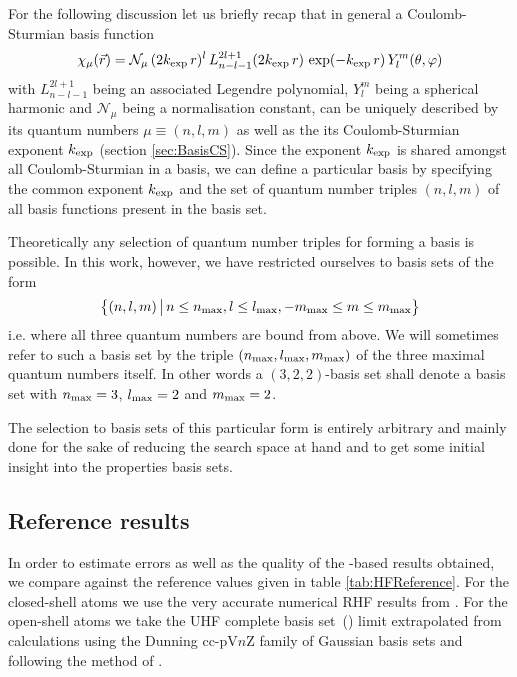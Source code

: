For the following discussion let us briefly recap
that in general a Coulomb-Sturmian basis function
\begin{equation}
\chi_\mu(\vec{r}) = \mathcal{N}_\mu \,
	(2 k_\text{exp} \, r)^l \,
	L^{2l+1}_{n-l-1}(2 k_\text{exp} \, r) \,
	\exp(- k_\text{exp} \, r) \,
	Y_l^m(\theta, \varphi)
	\label{eqn:FormCSBasisFunction}
\end{equation}
with $L^{2l+1}_{n-l-1}$ being an associated Legendre polynomial,
$Y_l^m$ being a spherical harmonic and $\mathcal{N}_\mu$ being a normalisation
constant,
can be uniquely described by its quantum numbers $\mu \equiv (n,l,m)$
as well as the its Coulomb-Sturmian exponent $k_\text{exp}$ (\cf section \vref{sec:BasisCS}).
Since the exponent $k_\text{exp}$ is shared amongst all Coulomb-Sturmian in a basis,
we can define a particular \CS basis
by specifying the common exponent $k_\text{exp}$
and the set of quantum number triples $(n, l, m)$ of all \CS basis functions
present in the basis set.

Theoretically any selection of quantum number triples for forming a basis
is possible.
In this work, however, we have restricted ourselves to basis sets of the form
\[ \big\{ (n, l, m) \, \big| \, n \le n_\text{max}, l \le l_\text{max}, -m_\text{max} \le m \le m_\text{max} \big\} \]
i.e. where all three quantum numbers are bound from above.
We will sometimes refer to such a \CS basis set by the triple
$(n_\text{max}, l_\text{max}, m_\text{max})$ of the three maximal quantum numbers itself.
In other words a $(3,2,2)$-basis set shall denote a basis set with
$n_\text{max} = 3$, $l_\text{max} = 2$ and $m_\text{max} = 2$.

The selection to basis sets of this particular form is entirely arbitrary
and mainly done for the sake of reducing the search space at hand
and to get some initial insight into the properties \CS basis sets.

\subsection{Reference results}
\defineabbr{CBS}{CBS\xspace}{complete basis set limit}

In order to estimate errors as well as the quality of the \CS-based \HF
results obtained,
we compare against the reference values given in table \vref{tab:HFReference}.
For the closed-shell atoms we use the very accurate numerical RHF results
from \citet{Morgon1997}.
For the open-shell atoms we take the UHF complete basis set~(\CBS)
limit extrapolated from calculations using the Dunning cc-pV$n$Z family
of Gaussian basis sets and following the method of \citet{Jensen2005}.



